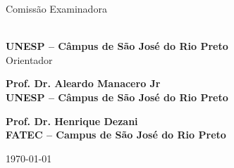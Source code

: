 	\begin{folhadeaprovacao}
	
	\begin{center}
		{\ABNTEXchapterfont\Large\imprimirautor}
		
		\vspace*{\fill}\vspace*{\fill}
		\begin{center}
			\ABNTEXchapterfont\LARGE\imprimirtitulo
		\end{center}
		\vspace*{\fill}
		
		\hspace{.45\textwidth}
			\begin{minipage}{.5\textwidth}
				\SingleSpacing
				\ABNTEXchapterfont\large\imprimirpreambulo
			\end{minipage}%
		\vspace*{\fill}
	\end{center}

	\begin{center}
		\ABNTEXchapterfont\Large Comissão Examinadora
	\end{center}

	\ABNTEXchapterfont\large
	
	\par \noindent \textbf{\imprimirorientador \\ UNESP – Câmpus de São José do Rio Preto} \\ Orientador \\
	
	\par \noindent \textbf{Prof. Dr. Aleardo Manacero Jr \\ UNESP – Câmpus de São José do Rio Preto} \\
	
	\par \noindent \textbf{Prof. Dr. Henrique Dezani \\ FATEC – Campus de São José do Rio Preto}
	
	\ABNTEXchapterfont
	
	\begin{center}
		\vspace*{0.5cm}
		{\large\imprimirlocal}
		\par
		{\large\today}
		\vspace*{1cm}
	\end{center}
\end{folhadeaprovacao}